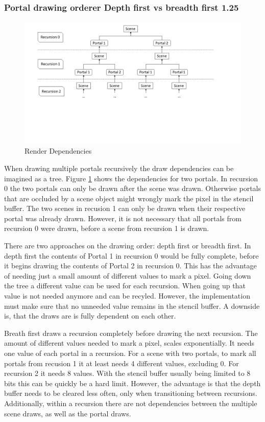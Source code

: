 \subsubsection{Portal drawing orderer Depth first vs breadth first 1.25}

\begin{figure}[h]
	\includegraphics[width=\linewidth]{images/rendertree.png}
	\caption{Render Dependencies}
	\label{fig:rendertree}
\end{figure}

When drawing multiple portals recursively the draw dependencies can be imagined as a tree. Figure \ref{fig:rendertree} shows the dependencies for two portals. In recursion 0 the two portals can only be drawn after the scene was drawn. Otherwise portals that are occluded by a scene object might wrongly mark the pixel in the stencil buffer. The two scenes in recusion 1 can only be drawn when their respective portal was already drawn. However, it is not necessary that all portals from recursion 0 were drawn, before a scene from recursion 1 is drawn.

There are two approaches on the drawing order: depth first or breadth first. In depth first the contents of Portal 1 in recursion 0 would be fully complete, before it begins drawing the contents of Portal 2 in recursion 0. This has the advantage of needing just a small amount of different values to mark a pixel. Going down the tree a different value can be used for each recursion. When going up that value is not needed anymore and can be recyled. However, the implementation must make sure that no unneeded value remains in the stencil buffer. A downside is, that the draws are is fully dependent on each other.

Breath first draws a recursion completely before drawing the next recursion. The amount of different values needed to mark a pixel, scales exponentially. It needs one value of each portal in a recursion. For a scene with two portals, to mark all portals from recusion 1 it at least needs 4 different values, excluding 0. For recursion 2 it needs 8 values. With the stencil buffer usually being limited to 8 bits this can be quickly be a hard limit. However, the advantage is that the depth buffer needs to be cleared less often, only when transitioning between recursions. Additionally, within a recursion there are not dependencies between the multiple scene draws, as well as the portal draws.

